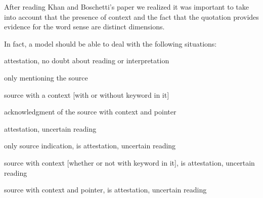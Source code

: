 \documentclass[10pt]{article}
\let\tempeone\enumerate
\let\tempetwo\endenumerate
\renewenvironment{enumerate}{\tempeone\setlength\itemsep{-0.5pt}\setlength{\partopsep}{-0.5pt}\setlength{\parsep}{-0.5pt}\setlength{\topsep}{-0.5pt}}{\tempetwo}
\begin{document}
 After reading Khan and Boschetti’s paper we realized it was important to take into account that the presence of context and the fact that the quotation provides evidence for the word sense are distinct dimensions.



 In fact, a model should be able to deal with the following situations:

{

\begin{enumerate}
	\item {\fontsize{10pt}{12.0pt}\selectfont attestation, no doubt about reading or interpretation}

\begin{enumerate}
	\item {\fontsize{10pt}{12.0pt}\selectfont only mentioning the source\par}

	\item {\fontsize{10pt}{12.0pt}\selectfont source with a context [with or without keyword in it]\par}\par

	\item {\fontsize{10pt}{12.0pt}\selectfont acknowledgment of the source with context and pointer \par}\par


\end{enumerate}
	\item {\fontsize{10pt}{12.0pt}\selectfont attestation, uncertain reading\par}

\begin{enumerate}
	\item {\fontsize{10pt}{12.0pt}\selectfont only source indication, is attestation, uncertain reading\par}\par

	\item {\fontsize{10pt}{12.0pt}\selectfont source with context [whether or not with keyword in it], is attestation, uncertain reading\par}\par

	\item {\fontsize{10pt}{12.0pt}\selectfont source with context and poi\setlength{\topsep}{-3\parskip}nter, is attestation, uncertain reading\par}\par



\end{enumerate}
\end{enumerate}}
\end{document}
